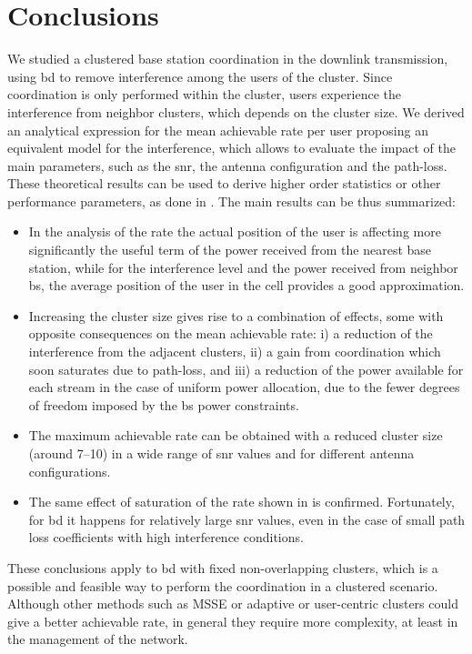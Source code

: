 \section{Conclusions}
We studied a clustered base station coordination in the downlink transmission, using \gls{bd} to remove interference among the users of the cluster. Since coordination is only performed within the cluster, users experience the interference from neighbor clusters, which depends on the cluster size. We derived an analytical expression for the mean achievable rate per user proposing an equivalent model for the interference, which allows to evaluate the impact of the main parameters, such as the \gls{snr}, the antenna configuration and the path-loss. These theoretical results can be used to derive higher order statistics or other performance parameters, as done in \cite{corvaja13a}. 
The main results can be thus summarized:
\begin{itemize}
\item In the analysis of the rate the actual position of the user is affecting more significantly the useful term of the power received from the nearest base station, while for the interference level and the power received from neighbor \gls{bs}, the average position of the user in the cell provides a good approximation.
\item Increasing the cluster size gives rise to a combination of effects, some with opposite consequences on the mean achievable rate: i) a reduction of the interference from the adjacent clusters, ii) a gain from coordination which soon saturates due to path-loss, and iii) a reduction of the power available for each stream in the case of uniform power allocation, due to the fewer degrees of freedom imposed by the \gls{bs} power constraints. 
\item The maximum achievable rate can be obtained with a reduced cluster size (around 7--10) in a wide range of \gls{snr} values and for different antenna configurations.
\item The same effect of saturation of the rate shown in \cite{lozano13} is confirmed. Fortunately, for \gls{bd} it happens for relatively large \gls{snr} values, even in the case of small path loss coefficients with high interference conditions.
\end{itemize}
These conclusions apply to \gls{bd} with fixed non-overlapping clusters, which is a possible and feasible way to perform the coordination in a clustered scenario. Although other methods such as MSSE or adaptive or user-centric clusters could give a better achievable rate, in general they require more complexity, at least in the management of the network.

